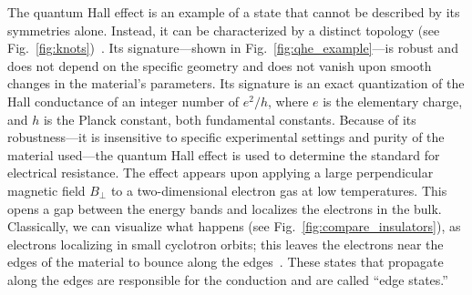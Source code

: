 The quantum Hall effect is an example of a state that cannot be described by its symmetries alone. Instead, it can be characterized by a distinct topology (see Fig.~\ref{fig:knots})~\cite{Avron2003}.
Its signature---shown in Fig.~\ref{fig:qhe_example}---is robust and does not depend on the specific geometry and does not vanish upon smooth changes in the material's parameters.
Its signature is an exact quantization of the Hall conductance of an integer number of $e^2/h$, where $e$ is the elementary charge, and $h$ is the Planck constant, both fundamental constants.
Because of its robustness---it is insensitive to specific experimental settings and purity of the material used---the quantum Hall effect is used to determine the standard for electrical resistance\cite{Jeckelmann2001}.
The effect appears upon applying a large perpendicular magnetic field $B_\perp$ to a two-dimensional electron gas at low temperatures.
This opens a gap between the energy bands and localizes the electrons in the bulk.
Classically, we can visualize what happens (see Fig.~\ref{fig:compare_insulators}), as electrons localizing in small cyclotron orbits; this leaves the electrons near the edges of the material to bounce along the edges~\cite{Hasan2010}.
These states that propagate along the edges are responsible for the conduction and are called ``edge states.''

